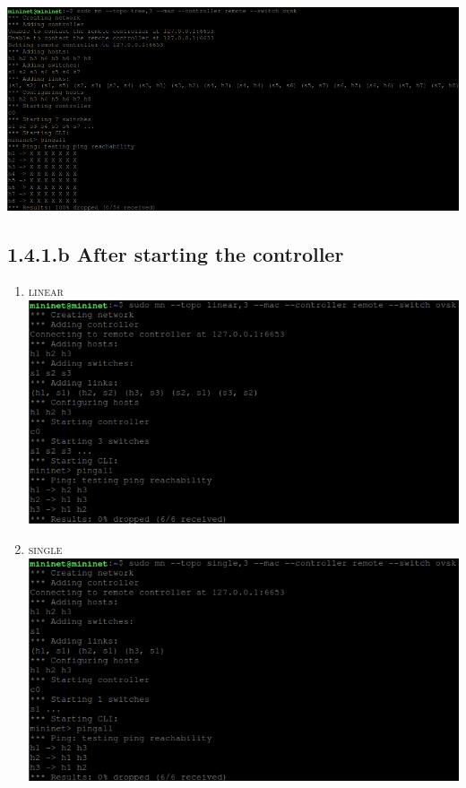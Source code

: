 \documentclass{article}
\begin{document}
\begin{adjustwidth}{2em}{2em}
\begin{adjustwidth}{2em}{2em}
\begin{enumerate}
			\includegraphics[scale=0.5]{tree_before.png}
		\end{enumerate}
		\end{adjustwidth}
		\subsection*{1.4.1.b After starting the controller}
		\begin{adjustwidth}{2em}{2em} 
		\begin{enumerate}
			\item \textsc{linear} \\
			\includegraphics[scale=0.5]{linear_after.png}
			\item \textsc{single} \\
			\includegraphics[scale=0.5]{single_after.png}

\end{enumerate}
\end{adjustwidth}
\end{adjustwidth}
\end{document}
